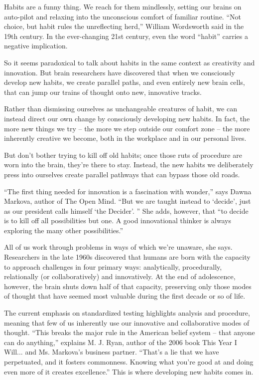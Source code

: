 Habits are a funny thing. We reach for them mindlessly, setting our brains on auto-pilot and relaxing into the unconscious comfort of familiar routine. ``Not choice, but habit rules the unreflecting herd,'' William Wordsworth said in the 19th century. In the ever-changing 21st century, even the word ``habit'' carries a negative implication.


So it seems paradoxical to talk about habits in the same context as creativity and innovation. But brain researchers have discovered that when we consciously develop new habits, we create parallel paths, and even entirely new brain cells, that can jump our trains of thought onto new, innovative tracks.


Rather than dismissing ourselves as unchangeable creatures of habit, we can instead direct our own change by consciously developing new habits. In fact, the more new things we try – the more we step outside our comfort zone – the more inherently creative we become, both in the workplace and in our personal lives.


But don't bother trying to kill off old habits; once those ruts of procedure are worn into the brain, they're there to stay. Instead, the new habits we deliberately press into ourselves create parallel pathways that can bypass those old roads.


``The first thing needed for innovation is a fascination with wonder,'' says Dawna Markova, author of The Open Mind. ``But we are taught instead to `decide', just as our president calls himself `the Decider'. '' She adds, however, that ``to decide is to kill off all possibilities but one. A good innovational thinker is always exploring the many other possibilities.''


All of us work through problems in ways of which we're unaware, she says. Researchers in the late 1960s discovered that humans are born with the capacity to approach challenges in four primary ways: analytically, procedurally, relationally (or collaboratively) and innovatively. At the end of adolescence, however, the brain shuts down half of that capacity, preserving only those modes of thought that have seemed most valuable during the first decade or so of life.


The current emphasis on standardized testing highlights analysis and procedure, meaning that few of us inherently use our innovative and collaborative modes of thought. ``This breaks the major rule in the American belief system – that anyone can do anything,'' explains M. J. Ryan, author of the 2006 book This Year I Will... and Ms. Markova's business partner. ``That's a lie that we have perpetuated, and it fosters commonness. Knowing what you're good at and doing even more of it creates excellence.'' This is where developing new habits comes in.